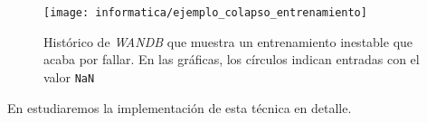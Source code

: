 \begin{figure}[H]
    \centering
    \texttt{[image: informatica/ejemplo\_colapso\_entrenamiento]}
    \caption{Histórico de \textit{WANDB} que muestra un entrenamiento inestable que acaba por fallar. En las gráficas, los círculos indican entradas con el valor \lstinline{NaN}}
\end{figure}

En  estudiaremos la implementación de esta técnica en detalle.
